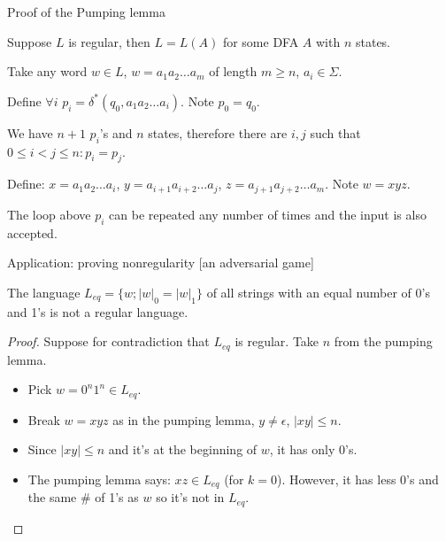 \documentclass[handout]{beamer}
\begin{document}
\begin{frame}{Proof of the Pumping lemma}

    Suppose $L$ is regular, then $L=L(A)$ for some DFA $A$ with $n$ states.
        
    Take any word $w\in L$, $w=a_1a_2\ldots a_m$ of length $m\geq n$, $a_i\in \Sigma$. 
    
    Define $\forall i$ $p_i=\delta^*(q_0,a_1a_2\ldots a_i)$. Note $p_0=q_0$.
    
    We have $n+1$ $p_i$'s and $n$ states, therefore there are $i,j$ such that $0\leq i< j\leq n: p_i=p_j$.
    
    Define: $x=a_1a_2\ldots a_i$, $y=a_{i+1}a_{i+2}\ldots a_j$, $z=a_{j+1}a_{j+2}\ldots a_m$. Note $w=xyz$.
       
    \begin{center}
    \end{center}
            

    The loop above $p_i$ can be repeated any number of times and the input is also accepted.\hfill\qedsymbol

\end{frame}


\begin{frame}{Application: proving nonregularity [an adversarial game]}

    \begin{example}
		The language $L_{eq}=\{w; |w|_0=|w|_1\}$ of all strings with an equal number of 0's and 1's is not a regular language.
	\end{example}
	\begin{proof}
        Suppose for contradiction that $L_{eq}$ is regular. Take $n$ from the pumping lemma.
        \begin{itemize}
            \item Pick $w=0^n1^n\in L_{eq}$.
            \item Break $w=xyz$ as in the pumping lemma, $y\neq \epsilon$, $|xy|\leq n$.
            \item Since $|xy|\leq n$ and it's at the beginning of $w$, it has only 0's. 
            \item The pumping lemma says: $xz\in L_{eq}$ (for $k=0$). However, it has less 0's and the same \# of 1's as $w$ so it's not in $L_{eq}$.
        \end{itemize} 
        \vspace{-24pt}  
	\end{proof}

\end{frame}
\end{document}
